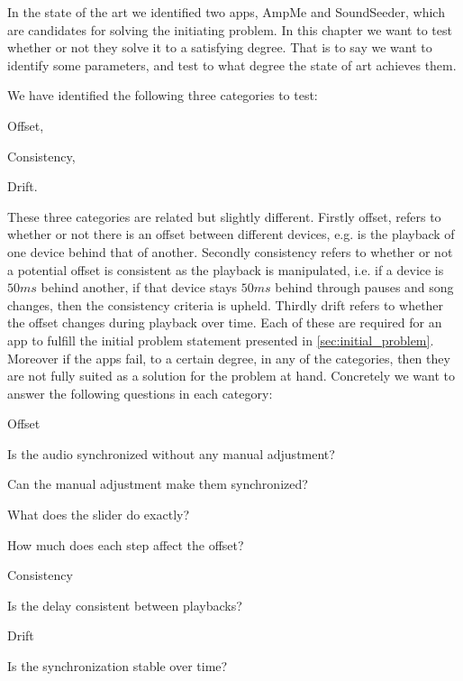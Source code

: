 In the state of the art we identified two apps, AmpMe and SoundSeeder, which are candidates for solving the initiating problem.
In this chapter we want to test whether or not they solve it to a satisfying degree.
That is to say we want to identify some parameters, and test to what degree the state of art achieves them.

We have identified the following three categories to test:
\begin{eletterate*}
    \item Offset,
    \item Consistency,
    \item Drift.
\end{eletterate*}

These three categories are related but slightly different.
Firstly offset, refers to whether or not there is an offset between different devices, e.g. is the playback of one device behind that of another.
Secondly consistency refers to whether or not a potential offset is consistent as the playback is manipulated, i.e. if a device is $50 ms$ behind another, if that device stays $50 ms$ behind through pauses and song changes, then the consistency criteria is upheld.
Thirdly drift refers to whether the offset changes during playback over time.
Each of these are required for an app to fulfill the initial problem statement presented in \vref{sec:initial_problem}.
Moreover if the apps fail, to a certain degree, in any of the categories, then they are not fully suited as a solution for the problem at hand.
Concretely we want to answer the following questions in each category:
\begin{eletterate}
    \item Offset
    \begin{enumberate}
        \item Is the audio synchronized without any manual adjustment?
        \item Can the manual adjustment make them synchronized?
        \begin{enumberate}
            \item What does the slider do exactly?
            \item How much does each step affect the offset?
        \end{enumberate}
    \end{enumberate}
    \item Consistency
    \begin{enumberate}[start=3]
        \item Is the delay consistent between playbacks?
    \end{enumberate}
    \item Drift
    \begin{enumberate}[start=4]
        \item Is the synchronization stable over time?
    \end{enumberate}
\end{eletterate}
